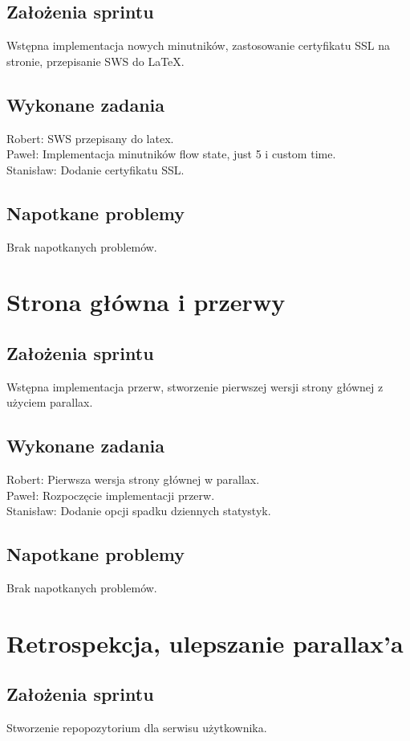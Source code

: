 \documentclass[a4paper,11pt]{report}
\begin{document}
\subsection {Założenia sprintu}
Wstępna implementacja nowych minutników, zastosowanie certyfikatu SSL na stronie, przepisanie SWS do LaTeX.
\subsection {Wykonane zadania}
Robert: SWS przepisany do latex.\\
Paweł: Implementacja minutników flow state, just 5 i custom time. \\ 
Stanisław: Dodanie certyfikatu SSL.  \\
\subsection {Napotkane problemy}
Brak napotkanych problemów.

\section {Strona główna i przerwy}
\subsection {Założenia sprintu}
Wstępna implementacja przerw, stworzenie pierwszej wersji strony głównej z użyciem parallax.
\subsection {Wykonane zadania}
Robert: Pierwsza wersja strony głównej w parallax.\\
Paweł: Rozpoczęcie implementacji przerw.\\
Stanisław: Dodanie opcji spadku dziennych statystyk.\\
\subsection {Napotkane problemy}
Brak napotkanych problemów.

\section {Retrospekcja, ulepszanie parallax'a}
\subsection {Założenia sprintu}
Stworzenie repopozytorium dla serwisu użytkownika.
\end{document}
